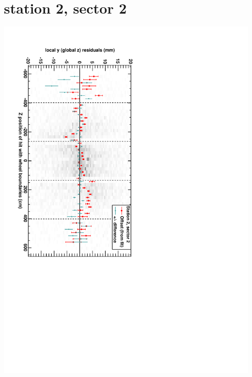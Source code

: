 \documentclass[compress]{beamer}
\begin{document}
\section*{station 2, sector 2}
\begin{frame} \vfill \mbox{\hspace{-1 cm}\includegraphics[height=1.2\linewidth, angle=90]{DTzVsZ_st2_sr02.pdf}} \end{frame}
\end{document}
